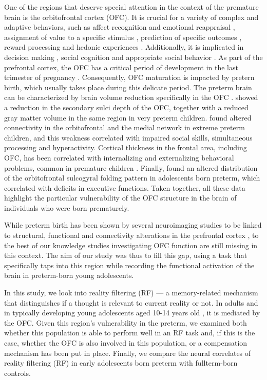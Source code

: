 One of the regions that deserve special attention in the context of the premature brain is the orbitofrontal cortex (OFC). It is crucial for a variety of complex and adaptive behaviors, such as affect recognition and emotional reappraisal \citep{Blair2000, Adolphs2001, Wager2008, Dixon2017}, assignment of value to a specific stimulus \citep{Montague2002}, prediction of specific outcomes \citep{Rudebeck2014}, reward processing \citep{Kahnt2018} and hedonic experiences \citep{KRINGELBACH2004}. Additionally, it is implicated in decision making \citep{Bechara2000,McClure2004}, social cognition and appropriate social behavior \citep{Rolls2004,Jonker2015} . As part of the prefrontal cortex, the OFC has a critical period of development in the last trimester of pregnancy \citep{Huttenlocher1997,Ruoss2001}. Consequently, OFC maturation is impacted by pretern birth, which usually takes place during this delicate period. The preterm brain can be characterized by brain volume reduction specifically in the OFC \citep{Thompson2007}. \citet{Gimenez2006} showed a reduction in the secondary sulci depth of the OFC, together with a reduced gray matter volume in the same region in very preterm children. \citet{Fischi-Gomez2015} found altered connectivity in the orbitofrontal and the medial network in extreme preterm children, and this weakness correlated with impaired social skills, simultaneous processing and hyperactivity. Cortical thickness in the frontal area, including OFC, has been correlated with internalizing and externalizing behavioral problems, common in premature children \citep{Zubiaurre-Elorza2012}. Finally, \citep{Ganella2015} found an altered distribution of the orbitofrontal sulcogyral folding pattern in adolescents born preterm, which correlated with deficits in executive functions. Taken together, all these data highlight the particular vulnerability of the OFC structure in the brain of individuals who were born prematurely.



While preterm birth has been shown by several neuroimaging studies to be linked to structural, functional and connectivity alterations in the prefrontal cortex \citep{Gimenez2006, Bjuland2013, Nosarti2014, Sripada2018}, to the best of our knowledge studies investigating OFC function are still missing in this context. The aim of our study was thus to fill this gap, using a task that specifically taps into this region while recording the functional activation of the brain in preterm-born young adolescents. 

In this study, we look into reality filtering (RF)  --- a memory-related mechanism that distinguishes if a thought is relevant to current reality or not. In adults \citep{Schnider2018} and in typically developing young adolescents aged 10-14 years old \citep{Liverani2020}, it is mediated by the OFC. Given this region's vulnerability in the preterm, we examined both whether this population is able to perform well in an RF task and, if this is the case, whether the OFC is also involved in this population, or a compensation mechanism has been put in place.  Finally, we compare the neural correlates of reality filtering (RF) in early adolescents born preterm with fullterm-born controls.

